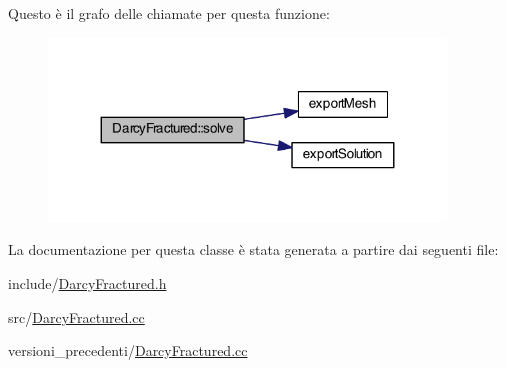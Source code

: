 Questo è il grafo delle chiamate per questa funzione\-:\nopagebreak
\begin{figure}[H]
\begin{center}
\leavevmode
\includegraphics[width=299pt]{classDarcyFractured_a074b6ec717f783c731b2be89f6528cc0_cgraph}
\end{center}
\end{figure}




La documentazione per questa classe è stata generata a partire dai seguenti file\-:\begin{DoxyCompactItemize}
\item 
include/\hyperlink{DarcyFractured_8h}{Darcy\-Fractured.\-h}\item 
src/\hyperlink{src_2DarcyFractured_8cc}{Darcy\-Fractured.\-cc}\item 
versioni\-\_\-precedenti/\hyperlink{versioni__precedenti_2DarcyFractured_8cc}{Darcy\-Fractured.\-cc}\end{DoxyCompactItemize}
